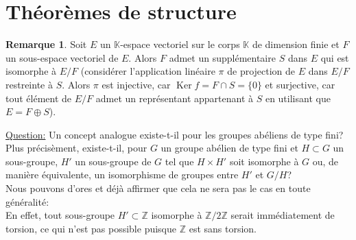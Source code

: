 \documentclass{report}
\newcommand{\Z}{\mathbb{Z}}
\newcommand{\K}{\mathbb{K}}
\renewcommand{\ker}{\mathop{\mathrm{Ker}}\nolimits}
\theoremstyle{definition}
\newtheorem{rem}[defi]{Remarque}
\newcommand{\ques}{\underline{Question:} }
\begin{document}
\section{Théorèmes de structure}

\begin{rem}
Soit $E$ un $\K$-espace vectoriel sur le corps $\K$ de dimension finie et $F$ un sous-espace vectoriel de $E$. Alors $F$ admet un supplémentaire $S$ dans $E$ qui est isomorphe \`a $E/F$ (consid\'erer l'application linéaire $\pi$ de projection de $E$ dans $E/F$ restreinte à $S$. Alors $\pi$ est  injective, car $\ker f = F \cap S =\{0\}$ et surjective, car tout élément de $E/F$ admet un représentant appartenant à $S$ en utilisant que $E=F\oplus S$).\bigbreak
\end{rem}

\ques Un concept analogue existe-t-il pour les groupes ab\'eliens de type fini?\medbreak
Plus pr\'ecis\`ement, existe-t-il, pour $G$ un groupe abélien de type fini et $H\subset G$ un sous-groupe, $H'$ un sous-groupe de $G$ tel que $H \times H'$ soit isomorphe \`a $G$ ou, de mani\`ere \'equivalente, un isomorphisme de groupes entre $H'$ et $G/H$?\\

Nous pouvons d'ores et d\'ej\`a affirmer que cela ne sera pas le cas en toute g\'en\'eralit\'e:\\
En effet, tout sous-groupe $H'\subset\Z$ isomorphe à $\Z/2\Z$ serait immédiatement de torsion, ce qui n'est pas possible puisque $\Z$ est sans torsion.\bigbreak
\end{document}
